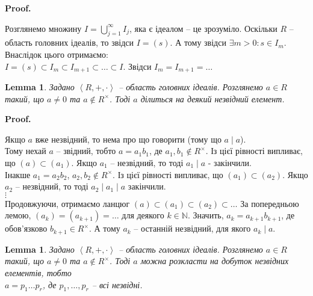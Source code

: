 \documentclass[a4paper, 10pt]{article}
\makeatletter
\theoremstyle{theoremdd}
\theoremstyle{theoremdd}
\theoremstyle{theoremdd}
\theoremstyle{theoremdd}
\theoremstyle{theoremdd}
\theoremstyle{theoremdd}
\theoremstyle{theoremdd}
\theoremstyle{theoremdd}
\theoremstyle{theoremdd}
\theoremstyle{theoremdd}
\theoremstyle{theoremdd}
\theoremstyle{theoremdd}
\theoremstyle{theoremdd}
\newtheorem{lemma}[theorem]{Lemma}
\theoremstyle{theoremdd}
\theoremstyle{theoremdd}
\renewenvironment{proof}[1][Proof.\\]{\par
\pushQED{\hfill \qed}%
\normalfont \topsep6\p@\@plus6\p@\relax
\trivlist
\item\relax
{\bfseries
#1\@addpunct{.}}\hspace\labelsep\ignorespaces
}{%
\popQED\endtrivlist\@endpefalse
}
\makeatother
\begin{document}
\begin{proof}
Розглянемо множину $I = \displaystyle\bigcup_{j=1}^\infty I_j$, яка є ідеалом -- це зрозуміло. Оскільки $R$ -- область головних ідеалів, то звідси $I = (s)$. А тому звідси $\exists m > 0: s \in I_m$. Внаслідок цього отримаємо:\\
$I = (s) \subset I_m \subset I_{m+1} \subset \dots \subset I$. Звідси $I_m = I_{m+1} = \dots$
\end{proof}

\begin{lemma}
Задано $\left<R,+,\cdot \right>$ -- область головних ідеалів. Розглянемо $a \in R$ такий, що $a \neq 0$ та $a \notin R^\times$. Тоді $a$ ділиться на деякий незвідний елемент.
\end{lemma}

\begin{proof}
Якщо $a$ вже незвідний, то нема про що говорити (тому що $a \mid a$).\\
Тому нехай $a$ -- звідний, тобто $a = a_1b_1$, де $a_1,b_1 \not \in R^\times$. Із цієї рівності випливає, що $(a) \subset (a_1)$. Якщо $a_1$ -- незвідний, то тоді $a_1 \mid a$ - закінчили.\\
Інакше $a_1 = a_2b_2$, $a_2,b_2 \not\in R^\times$. Із цієї рівності випливає, що $(a_1) \subset (a_2)$. Якщо $a_2$ -- незвідний, то тоді $a_2 \mid a_1 \mid a$ закінчили.\\
$\vdots$\\
Продовжуючи, отримаємо ланцюг $(a) \subset (a_1) \subset (a_2) \subset \dots$ За попередньою лемою, $(a_k) = (a_{k+1}) = \dots$ для деякого $k \in \mathbb{N}$. Значить, $a_k = a_{k+1} b_{k+1}$, де обов'язково $b_{k+1} \in R^\times$. А тому $a_k$ -- останній незвідний, для якого $a_k \mid a$.
\end{proof}

\begin{lemma}
Задано $\left<R,+,\cdot \right>$ -- область головних ідеалів. Розглянемо $a \in R$ такий, що $a \neq 0$ та $a \notin R^\times$. Тоді $a$ можна розкласти на добуток незвідних елементів, тобто\\
$a = p_1 \dots p_r$, де $p_1,\dots,p_r$ -- всі незвідні.
\end{lemma}
\end{document}

